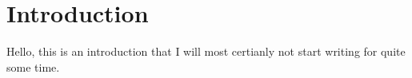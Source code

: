 \chapter{Introduction}
\hypertarget{index}{}\label{index}
Hello, this is an introduction that I will most certianly not start writing for quite some time. 